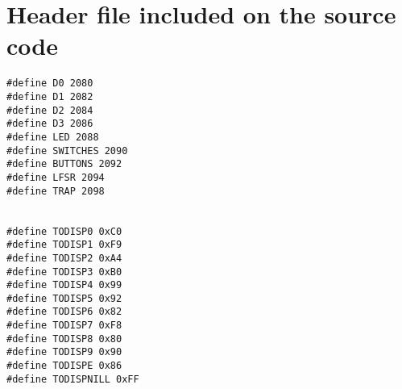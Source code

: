
\clearpage
\appendix
\appendixpage
\section{Header file included on the source code}
\begin{lstlisting}[style=CStyle]
#define D0 2080
#define D1 2082
#define D2 2084
#define D3 2086
#define LED 2088
#define SWITCHES 2090
#define BUTTONS 2092
#define LFSR 2094
#define TRAP 2098


#define TODISP0 0xC0
#define TODISP1 0xF9
#define TODISP2 0xA4
#define TODISP3 0xB0
#define TODISP4 0x99
#define TODISP5 0x92
#define TODISP6 0x82
#define TODISP7 0xF8
#define TODISP8 0x80
#define TODISP9 0x90
#define TODISPE 0x86
#define TODISPNILL 0xFF
\end{lstlisting}


